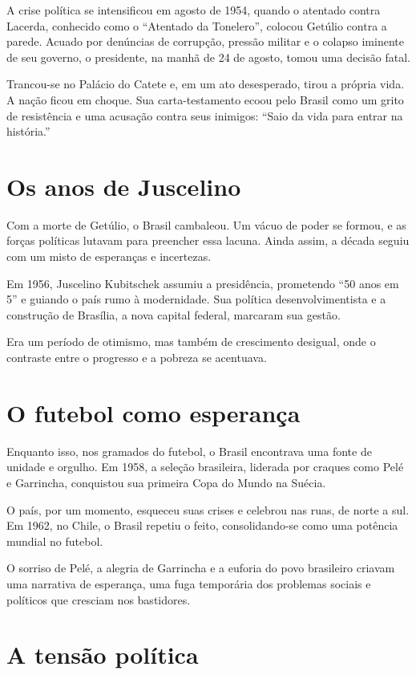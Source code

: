 A crise política se intensificou em agosto de 1954, quando o atentado contra Lacerda, conhecido como o ``Atentado da Tonelero'', colocou Getúlio contra a parede. Acuado por denúncias de corrupção, pressão militar e o colapso iminente de seu governo, o presidente, na manhã de 24 de agosto, tomou uma decisão fatal.

Trancou-se no Palácio do Catete e, em um ato desesperado, tirou a própria vida. A nação ficou em choque. Sua carta-testamento ecoou pelo Brasil como um grito de resistência e uma acusação contra seus inimigos: “Saio da vida para entrar na história.”

\section*{Os anos de Juscelino}

Com a morte de Getúlio, o Brasil cambaleou. Um vácuo de poder se formou, e as forças políticas lutavam para preencher essa lacuna. Ainda assim, a década seguiu com um misto de esperanças e incertezas.

Em 1956, Juscelino Kubitschek assumiu a presidência, prometendo ``50 anos em 5'' e guiando o país rumo à modernidade. Sua política desenvolvimentista e a construção de Brasília, a nova capital federal, marcaram sua gestão.

Era um período de otimismo, mas também de crescimento desigual, onde o contraste entre o progresso e a pobreza se acentuava.

\section*{O futebol como esperança}

Enquanto isso, nos gramados do futebol, o Brasil encontrava uma fonte de unidade e orgulho. Em 1958, a seleção brasileira, liderada por craques como Pelé e Garrincha, conquistou sua primeira Copa do Mundo na Suécia.

O país, por um momento, esqueceu suas crises e celebrou nas ruas, de norte a sul. Em 1962, no Chile, o Brasil repetiu o feito, consolidando-se como uma potência mundial no futebol.

O sorriso de Pelé, a alegria de Garrincha e a euforia do povo brasileiro criavam uma narrativa de esperança, uma fuga temporária dos problemas sociais e políticos que cresciam nos bastidores.

\section*{A tensão política}

